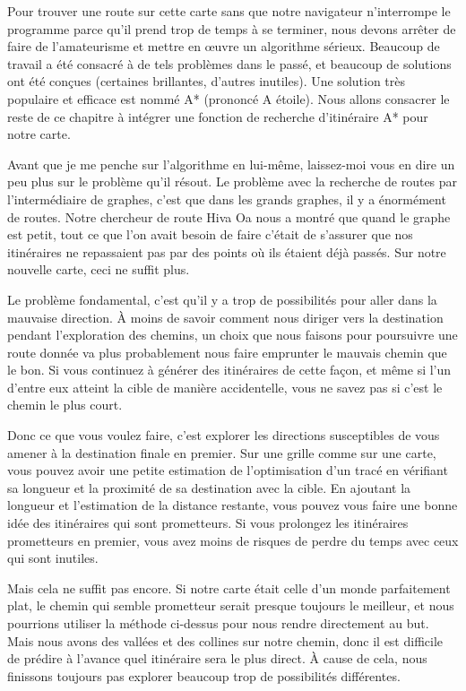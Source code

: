 \documentclass{FramateX}
\begin{document}
Pour trouver une route sur cette carte sans que notre navigateur
n'interrompe le programme parce qu'il prend trop de temps à se terminer,
nous devons arrêter de faire de l'amateurisme et mettre en œuvre un
algorithme sérieux. Beaucoup de travail a été consacré à de tels
problèmes dans le passé, et beaucoup de solutions ont été conçues
(certaines brillantes, d'autres inutiles). Une solution très populaire
et efficace est nommé A* (prononcé A étoile). Nous allons consacrer le
reste de ce chapitre à intégrer une fonction de recherche d'itinéraire
A* pour notre carte.

Avant que je me penche sur l'algorithme en lui-même, laissez-moi vous en
dire un peu plus sur le problème qu'il résout. Le problème avec la
recherche de routes par l'intermédiaire de graphes, c'est que dans les
grands graphes, il y a énormément de routes. Notre chercheur de route
Hiva Oa nous a montré que quand le graphe est petit, tout ce que l'on
avait besoin de faire c'était de s'assurer que nos itinéraires ne
repassaient pas par des points où ils étaient déjà passés. Sur notre
nouvelle carte, ceci ne suffit plus.

Le problème fondamental, c'est qu'il y a trop de possibilités pour aller
dans la mauvaise direction. À moins de savoir comment nous diriger vers
la destination pendant l'exploration des chemins, un choix que nous
faisons pour poursuivre une route donnée va plus probablement nous faire
emprunter le mauvais chemin que le bon. Si vous continuez à générer des
itinéraires de cette façon, et même si l'un d'entre eux atteint la cible
de manière accidentelle, vous ne savez pas si c'est le chemin le plus
court.

Donc ce que vous voulez faire, c'est explorer les directions
susceptibles de vous amener à la destination finale en premier. Sur une
grille comme sur une carte, vous pouvez avoir une petite estimation de
l'optimisation d'un tracé en vérifiant sa longueur et la proximité de sa
destination avec la cible. En ajoutant la longueur et l'estimation de la
distance restante, vous pouvez vous faire une bonne idée des itinéraires
qui sont prometteurs. Si vous prolongez les itinéraires prometteurs en
premier, vous avez moins de risques de perdre du temps avec ceux qui
sont inutiles.

\begin{center}\end{center}

Mais cela ne suffit pas encore. Si notre carte était celle d'un monde
parfaitement plat, le chemin qui semble prometteur serait presque
toujours le meilleur, et nous pourrions utiliser la méthode ci-dessus
pour nous rendre directement au but. Mais nous avons des vallées et des
collines sur notre chemin, donc il est difficile de prédire à l'avance
quel itinéraire sera le plus direct. À cause de cela, nous finissons
toujours pas explorer beaucoup trop de possibilités différentes.
\end{document}
